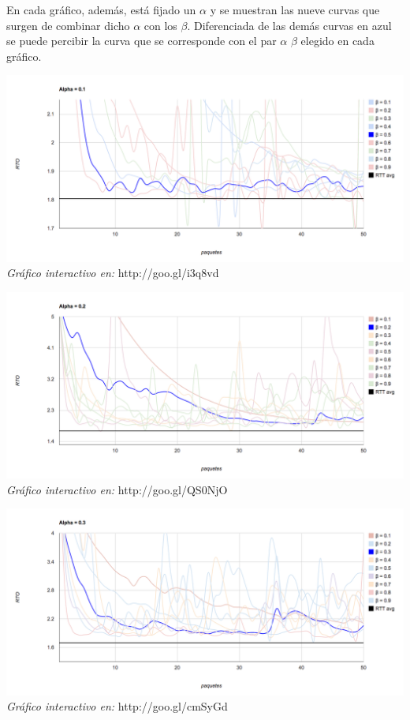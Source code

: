 \indent En cada gráfico, además, está fijado un $\alpha$ y se muestran las nueve curvas que surgen de combinar dicho $\alpha$ con los $\beta$. Diferenciada de las demás curvas en azul se puede percibir la curva que se corresponde con el par $\alpha$ $\beta$ elegido en cada gráfico.\\
\begin{center}
	\includegraphics[scale=0.35]{graphics/rto_vs_paquetes_a_1.png}
	\textit{Gráfico interactivo en:} http://goo.gl/i3q8vd
\end{center}

\begin{center}
	\includegraphics[scale=0.35]{graphics/rto_vs_paquetes_a_2.png}
	\textit{Gráfico interactivo en:} http://goo.gl/QS0NjO
\end{center}

\begin{center}
	\includegraphics[scale=0.35]{graphics/rto_vs_paquetes_a_3.png}
	\textit{Gráfico interactivo en:} http://goo.gl/cmSyGd
\end{center}

